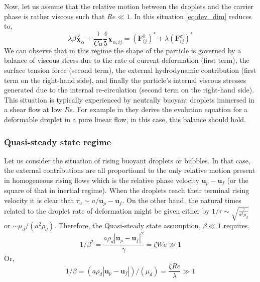 Now, let us assume that the relative motion between the droplets and the carrier phase is rather viscous such that $Re \ll 1$.
In this situation \ref{eq:dev_dim} reduces to, 
\begin{equation*}
    \lambda \beta \overset{ \triangledown  }{\bm\chi}_\alpha
    + \frac{1}{Ca}
    \frac{4  }{5} \bm\chi_{\alpha,ij}
    = (\textbf{F}_{ij}^h)^* 
    + \lambda (\textbf{F}_{ij}^{\sigma})^*
    \label{eq:stokes_shape}
\end{equation*}
We can observe that in this regime the shape of the particle is governed by a balance of viscous stress due to the rate of current deformation (first term), the surface tension force (second term), the external hydrodynamic contribution (first term on the right-hand side), and finally the particle's internal viscous stresses generated due to the internal re-circulation (second term on the right-hand side). 
This situation is typically experienced by neutrally buoyant droplets immersed in a shear flow at low $Re$. 
For example in \citet[Chapter 7]{leal2007advanced} they derive the evolution equation for a deformable droplet in a pure linear flow, in this case, this balance should hold. 

\subsubsection{Quasi-steady state regime}

Let us consider the situation of rising buoyant droplets or bubbles. 
In that case, the external contributions are all proportional to the only relative motion present in homogeneous rising flows which is the relative phase velocity $\textbf{u}_p-\textbf{u}_f$ (or the square of that in inertial regime).
When the droplets reach their terminal rising velocity it is clear that $\tau_u \sim a / \textbf{u}_p-\textbf{u}_f $.
On the other hand, the natural times related to the droplet rate of deformation might be given either by $1 / \tau \sim \sqrt{\frac{ \gamma }{a^3\rho_d}}$ or $\sim  \mu_d  /(a^2\rho_d)$. 
Therefore, the Quasi-steady state assumption, $\beta \ll 1$ requires, 
\begin{equation}
  1/\beta^2 =  \frac{a\rho_d |\textbf{u}_p-\textbf{u}_f|^2}{\gamma } = \zeta We \gg 1 
\end{equation}
Or, 
\begin{equation}
    1/\beta = (a\rho_d|\textbf{u}_p-\textbf{u}_f|)/(\mu_d ) = \frac{\zeta Re }{\lambda} \gg 1
\end{equation}

